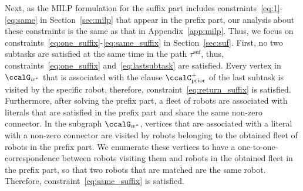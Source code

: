 \documentclass[Afour,sageh,times]{sagej}
\begin{document}
{Next, as the MILP formulation for the suffix part includes constraints~\eqref{eq:1}-\eqref{eq:same} in Section~\ref{sec:milp} that appear in the prefix part, our analysis about these constraints is the same as that in Appendix~\ref{app:milp}. Thus, we focus on constraints~\eqref{eq:one_suffix}-\eqref{eq:same_suffix} in Section~\ref{sec:suf}. First, no two subtasks are satisfied at the same time in the path $\tau^{\text{suf}}$, thus, constraints~\eqref{eq:one_suffix} and~\eqref{eq:lastsubtask} are  satisfied. Every vertex in $\ccalG_{w^*}$ that is associated with the clause $\ccalC_{\text{prior}}^+$ of the last subtask is visited by the specific  robot, therefore, constraint~\eqref{eq:return_suffix} is satisfied. %
Furthermore, after solving  the prefix part, a fleet of robots are associated with literals that are  satisfied in the prefix part and share the same non-zero connector. In the subgraph $\ccalG_{w^*}$,  vertices  that are associated with a literal with a non-zero connector are visited by  robots belonging to the obtained fleet of robots in the prefix part. We enumerate these vertices to  have a one-to-one-correspondence between robots visiting them and robots in the obtained fleet in the prefix part, so that  two  robots that are matched  are the same robot. Therefore, constraint~\eqref{eq:same_suffix} is satisfied.

}
\end{document}
